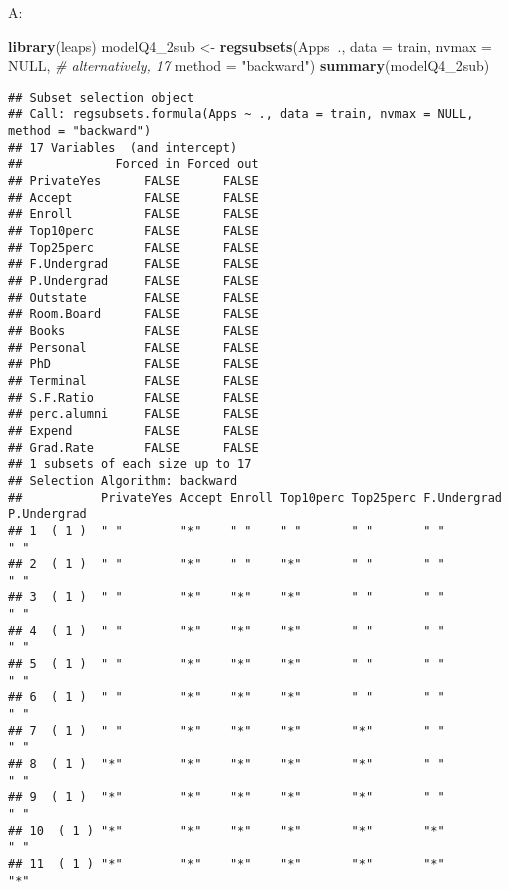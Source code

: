 \documentclass[
]{article}
\newenvironment{Shaded}{\begin{snugshade}}{\end{snugshade}}
\newcommand{\CommentTok}[1]{\textcolor[rgb]{0.56,0.35,0.01}{\textit{#1}}}
\newcommand{\DataTypeTok}[1]{\textcolor[rgb]{0.13,0.29,0.53}{#1}}
\newcommand{\KeywordTok}[1]{\textcolor[rgb]{0.13,0.29,0.53}{\textbf{#1}}}
\newcommand{\NormalTok}[1]{#1}
\newcommand{\OperatorTok}[1]{\textcolor[rgb]{0.81,0.36,0.00}{\textbf{#1}}}
\newcommand{\OtherTok}[1]{\textcolor[rgb]{0.56,0.35,0.01}{#1}}
\newcommand{\StringTok}[1]{\textcolor[rgb]{0.31,0.60,0.02}{#1}}
\begin{document}
A:

\begin{Shaded}
\begin{Highlighting}[]
\KeywordTok{library}\NormalTok{(leaps)}
\NormalTok{modelQ4_2sub <-}\StringTok{ }\KeywordTok{regsubsets}\NormalTok{(Apps}\OperatorTok{~}\NormalTok{., }\DataTypeTok{data =}\NormalTok{ train,}
                           \DataTypeTok{nvmax =} \OtherTok{NULL}\NormalTok{,  }\CommentTok{# alternatively, 17}
                           \DataTypeTok{method =} \StringTok{"backward"}\NormalTok{)}
\KeywordTok{summary}\NormalTok{(modelQ4_2sub)}
\end{Highlighting}
\end{Shaded}

\begin{verbatim}
## Subset selection object
## Call: regsubsets.formula(Apps ~ ., data = train, nvmax = NULL, method = "backward")
## 17 Variables  (and intercept)
##             Forced in Forced out
## PrivateYes      FALSE      FALSE
## Accept          FALSE      FALSE
## Enroll          FALSE      FALSE
## Top10perc       FALSE      FALSE
## Top25perc       FALSE      FALSE
## F.Undergrad     FALSE      FALSE
## P.Undergrad     FALSE      FALSE
## Outstate        FALSE      FALSE
## Room.Board      FALSE      FALSE
## Books           FALSE      FALSE
## Personal        FALSE      FALSE
## PhD             FALSE      FALSE
## Terminal        FALSE      FALSE
## S.F.Ratio       FALSE      FALSE
## perc.alumni     FALSE      FALSE
## Expend          FALSE      FALSE
## Grad.Rate       FALSE      FALSE
## 1 subsets of each size up to 17
## Selection Algorithm: backward
##           PrivateYes Accept Enroll Top10perc Top25perc F.Undergrad P.Undergrad
## 1  ( 1 )  " "        "*"    " "    " "       " "       " "         " "        
## 2  ( 1 )  " "        "*"    " "    "*"       " "       " "         " "        
## 3  ( 1 )  " "        "*"    "*"    "*"       " "       " "         " "        
## 4  ( 1 )  " "        "*"    "*"    "*"       " "       " "         " "        
## 5  ( 1 )  " "        "*"    "*"    "*"       " "       " "         " "        
## 6  ( 1 )  " "        "*"    "*"    "*"       " "       " "         " "        
## 7  ( 1 )  " "        "*"    "*"    "*"       "*"       " "         " "        
## 8  ( 1 )  "*"        "*"    "*"    "*"       "*"       " "         " "        
## 9  ( 1 )  "*"        "*"    "*"    "*"       "*"       " "         " "        
## 10  ( 1 ) "*"        "*"    "*"    "*"       "*"       "*"         " "        
## 11  ( 1 ) "*"        "*"    "*"    "*"       "*"       "*"         "*"        

\end{verbatim}
\end{document}

